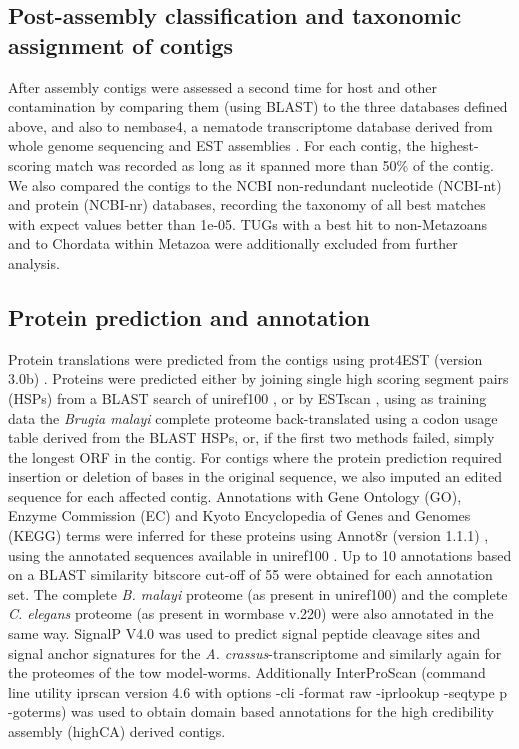 \documentclass[10pt]{bmc_article}
\newenvironment{bmcformat}{\begin{raggedright}\baselineskip20pt\sloppy\setboolean{publ}{false}}{\end{raggedright}\baselineskip20pt\sloppy}
\begin{document}
\begin{bmcformat}
\subsection*{Post-assembly classification and taxonomic assignment of
  contigs}

After assembly contigs were assessed a second time for host and other
contamination by comparing them (using BLAST) to the three databases
defined above, and also to nembase4, a nematode transcriptome database
derived from whole genome sequencing and EST assemblies
\cite{parkinson_nembase:resource_2004, pmid21550347}. For each contig,
the highest-scoring match was recorded as long as it spanned more than
50\% of the contig. We also compared the contigs to the NCBI
non-redundant nucleotide (NCBI-nt) and protein (NCBI-nr) databases,
recording the taxonomy of all best matches with expect values better
than 1e-05. TUGs with a best hit to non-Metazoans and to Chordata
within Metazoa were additionally excluded from further analysis.


\subsection*{Protein prediction and annotation}

Protein translations were predicted from the contigs using prot4EST
(version 3.0b) \cite{wasmuth_prot4est:_2004}. Proteins were predicted
either by joining single high scoring segment pairs (HSPs) from a
BLAST search of uniref100 \cite{pmid18836194}, or by ESTscan
\cite{estscan}, using as training data the \textit{Brugia malayi}
complete proteome back-translated using a codon usage table derived
from the BLAST HSPs, or, if the first two methods failed, simply the
longest ORF in the contig. For contigs where the protein prediction
required insertion or deletion of bases in the original sequence, we
also imputed an edited sequence for each affected contig. Annotations
with Gene Ontology (GO), Enzyme Commission (EC) and Kyoto Encyclopedia
of Genes and Genomes (KEGG) terms were inferred for these proteins
using Annot8r (version 1.1.1) \cite{schmid_annot8r:_2008}, using the
annotated sequences available in uniref100 \cite{pmid18836194}. Up to
10 annotations based on a BLAST similarity bitscore cut-off of 55 were
obtained for each annotation set. The complete \textit{B. malayi}
proteome (as present in uniref100) and the complete
\textit{C. elegans} proteome (as present in wormbase v.220) were also
annotated in the same way. SignalP V4.0 \cite{pmid21959131} was used
to predict signal peptide cleavage sites and signal anchor signatures
for the \textit{A. crassus}-transcriptome and similarly again for the
proteomes of the tow model-worms.  Additionally InterProScan
\cite{pmid11590104} (command line utility iprscan version 4.6 with
options -cli -format raw -iprlookup -seqtype p -goterms) was used to
obtain domain based annotations for the high credibility assembly
(highCA) derived contigs.


\end{bmcformat}
\end{document}

